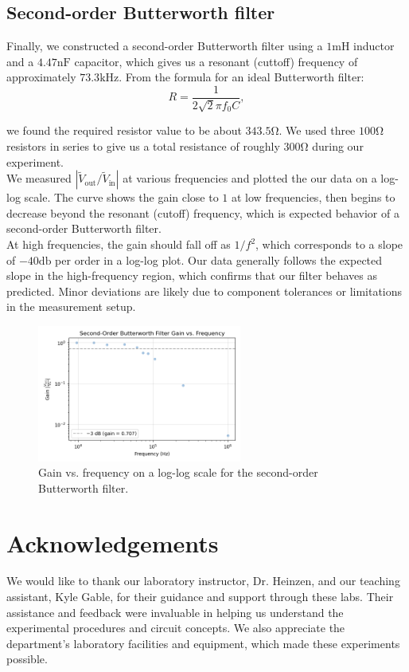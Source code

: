 \documentclass{article}
\begin{document}
\subsection{Second-order Butterworth filter}

Finally, we constructed a second-order Butterworth filter using a $1\si{\milli\henry}$
inductor and a $4.47\si{\nano\farad}$ capacitor, which gives us a resonant
(cuttoff) frequency of approximately $73.3\si{\kilo\hertz}$. From the formula
for an ideal Butterworth filter:
\begin{equation}
    R=\frac{1}{2\sqrt{2}\pi f_0 C},
\end{equation}

\noindent we found the required resistor value to be about $343.5\si{\ohm}$. We used three $100\si{\ohm}$
resistors in series to give us a total resistance of roughly $300\si{\ohm}$ during our experiment.\\

\noindent We measured $|\widetilde{V}_\text{out} / \widetilde{V}_\text{in}|$ at various frequencies
and plotted the our data on a log-log scale. The curve shows the gain close to $1$
at low frequencies, then begins to decrease beyond the resonant (cutoff) frequency,
which is expected behavior of a second-order Butterworth filter.\\

\noindent At high frequencies, the gain should fall off as $1/f^2$, which corresponds to
a slope of $-40\si{\decibel}$ per order in a log-log plot. Our data generally follows
the expected slope in the high-frequency region, which confirms that our filter
behaves as predicted. Minor deviations are likely due to component tolerances
or limitations in the measurement setup.

\begin{figure}[H]
    \centering
    \includegraphics[width=0.6\textwidth]{3.da.png}
    \caption{Gain vs. frequency on a log-log scale for the second-order Butterworth filter.}
    \label{fig:butterworth_gain}
\end{figure}

\section*{Acknowledgements}

We would like to thank our laboratory instructor, Dr. Heinzen, and our teaching 
assistant, Kyle Gable, for their guidance and support through these labs. Their 
assistance and feedback were invaluable in helping us understand the experimental 
procedures and circuit concepts. We also appreciate the department's laboratory 
facilities and equipment, which made these experiments possible.
\end{document}
